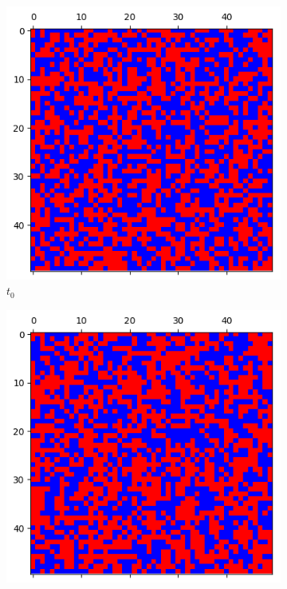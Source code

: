 \documentclass[letterpaper]{article}
\begin{document}
\begin{figure}[H]
    \begin{subfigure}{.33\textwidth}
      \centering
      \includegraphics[width=1\linewidth]{images/assign2/visu_50-part2/t0}
      \caption{$t_0$}
      \label{fig:t0_50part2}
    \end{subfigure}
    \begin{subfigure}{.33\textwidth}
      \centering
      \includegraphics[width=1\linewidth]{images/assign2/visu_50-part2/t1}

\end{subfigure}
\end{figure}
\end{document}
